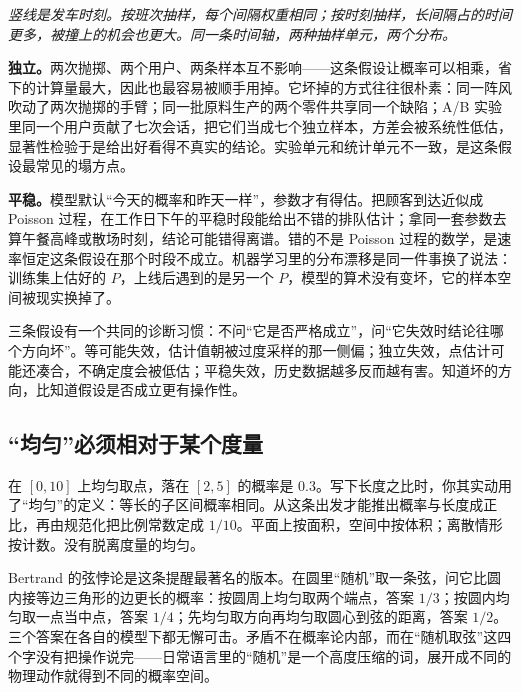 \begin{center}

\emph{竖线是发车时刻。按班次抽样，每个间隔权重相同；按时刻抽样，长间隔占的时间更多，被撞上的机会也更大。同一条时间轴，两种抽样单元，两个分布。}
\end{center}

\textbf{独立。}两次抛掷、两个用户、两条样本互不影响——这条假设让概率可以相乘，省下的计算量最大，因此也最容易被顺手用掉。它坏掉的方式往往很朴素：同一阵风吹动了两次抛掷的手臂；同一批原料生产的两个零件共享同一个缺陷；A/B 实验里同一个用户贡献了七次会话，把它们当成七个独立样本，方差会被系统性低估，显著性检验于是给出好看得不真实的结论。实验单元和统计单元不一致，是这条假设最常见的塌方点。

\textbf{平稳。}模型默认``今天的概率和昨天一样''，参数才有得估。把顾客到达近似成 Poisson 过程，在工作日下午的平稳时段能给出不错的排队估计；拿同一套参数去算午餐高峰或散场时刻，结论可能错得离谱。错的不是 Poisson 过程的数学，是速率恒定这条假设在那个时段不成立。机器学习里的分布漂移是同一件事换了说法：训练集上估好的 \(P\)，上线后遇到的是另一个 \(P\)，模型的算术没有变坏，它的样本空间被现实换掉了。

三条假设有一个共同的诊断习惯：不问``它是否严格成立''，问``它失效时结论往哪个方向坏''。等可能失效，估计值朝被过度采样的那一侧偏；独立失效，点估计可能还凑合，不确定度会被低估；平稳失效，历史数据越多反而越有害。知道坏的方向，比知道假设是否成立更有操作性。

\subsection{``均匀''必须相对于某个度量}

在 \([0,10]\) 上均匀取点，落在 \([2,5]\) 的概率是 \(0.3\)。写下长度之比时，你其实动用了``均匀''的定义：等长的子区间概率相同。从这条出发才能推出概率与长度成正比，再由规范化把比例常数定成 \(1/10\)。平面上按面积，空间中按体积；离散情形按计数。没有脱离度量的均匀。

Bertrand 的弦悖论是这条提醒最著名的版本。在圆里``随机''取一条弦，问它比圆内接等边三角形的边更长的概率：按圆周上均匀取两个端点，答案 \(1/3\)；按圆内均匀取一点当中点，答案 \(1/4\)；先均匀取方向再均匀取圆心到弦的距离，答案 \(1/2\)。三个答案在各自的模型下都无懈可击。矛盾不在概率论内部，而在``随机取弦''这四个字没有把操作说完——日常语言里的``随机''是一个高度压缩的词，展开成不同的物理动作就得到不同的概率空间。

